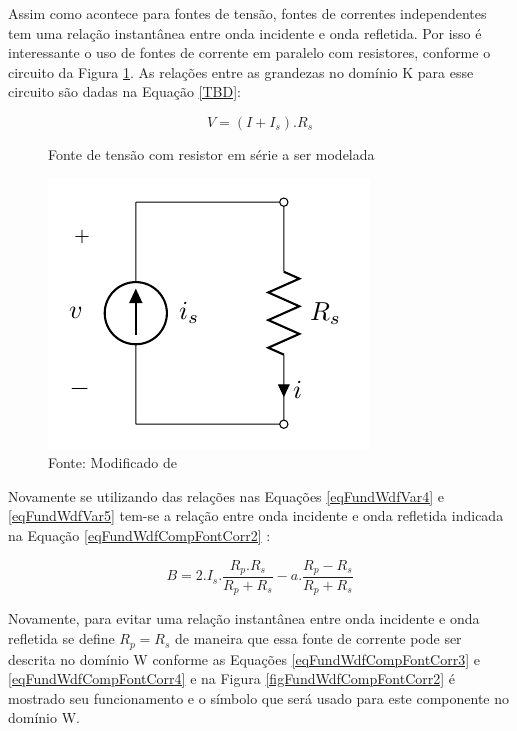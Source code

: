 	Assim como acontece para fontes de tensão, fontes de correntes independentes tem uma relação instantânea entre onda incidente e onda refletida. Por isso é interessante o uso de fontes de corrente em paralelo com resistores, conforme o circuito da Figura \ref{figFundWdfCompFontCorr1}. As relações entre as grandezas no domínio K para esse circuito são dadas na Equação \ref{TBD}:
	
	\begin{equation}
		\label{eqFundWdfCompFontCorr1}
		V = (I + I_s).R_s
	\end{equation}
	
	\begin{figure}[h]
		\label{figFundWdfCompFontCorr1}
		\caption{Fonte de tensão com resistor em série a ser modelada}
		\includegraphics[scale=0.5]{images/fonteCorrenteModelada}
		\centering
		\caption*{Fonte: Modificado de \cite{Bogason2017}}
	\end{figure}
	
	Novamente se utilizando das relações nas Equações \ref{eqFundWdfVar4} e \ref{eqFundWdfVar5} tem-se a relação entre onda incidente e onda refletida indicada na Equação \ref{eqFundWdfCompFontCorr2} :
	
	\begin{equation}
		\label{eqFundWdfCompFontCorr2}
		B = 2.I_s.\frac{R_p.R_s}{R_p+R_s}-a.\frac{R_p-R_s}{R_p+R_s}
	\end{equation}
	
	Novamente, para evitar uma relação instantânea entre onda incidente e onda refletida se define $R_p = R_s$ de maneira que essa fonte de corrente pode ser descrita no domínio W conforme as Equações \ref{eqFundWdfCompFontCorr3} e \ref{eqFundWdfCompFontCorr4} e na Figura \ref{figFundWdfCompFontCorr2} é mostrado seu funcionamento e o símbolo que será usado para este componente no domínio W.
	
